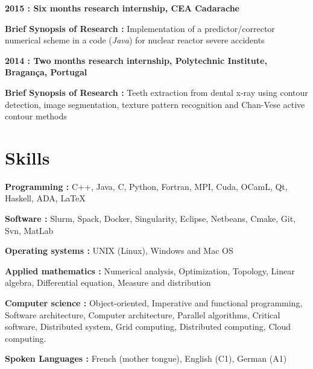 \documentclass{article}
\renewenvironment{itemize}{
  \begin{list}{}{
      \setlength{\leftmargin}{1.5em}
      \setlength{\itemsep}{0.25em}
      \setlength{\parskip}{0pt}
      \setlength{\parsep}{0.25em}
    }
}{
  \end{list}
}
\begin{document}
\begin{itemize}
\begin{itemize}
			\end{itemize}
	\item \textbf{2015 : Six months research internship, CEA Cadarache}
		\begin{itemize}
			\item \textbf{Brief Synopsis of Research :} Implementation of a predictor/corrector numerical scheme in a code (\textit{Java}) for nuclear reactor severe accidents
		\end{itemize}
	\item \textbf{2014 : Two months research internship, Polytechnic Institute, Bragança, Portugal}
		\begin{itemize}
			\item \textbf{Brief Synopsis of Research :} Teeth extraction from dental x-ray using contour detection, image segmentation, texture pattern recognition and Chan-Vese active contour methods
		\end{itemize}
\end{itemize}  

\section*{Skills}
\begin{itemize}
	\item \textbf{Programming :} C++, Java, C, Python, Fortran, MPI, Cuda, OCamL, Qt, Haskell, ADA, \LaTeX
	\item \textbf{Software :} Slurm, Spack, Docker, Singularity, Eclipse, Netbeans, Cmake, Git, Svn, MatLab
	\item \textbf{Operating systems :} UNIX (Linux), Windows and Mac OS
	\item \textbf{Applied mathematics :} Numerical analysis, Optimization, Topology, Linear algebra, Differential equation, Measure and distribution
	\item \textbf{Computer science :} Object-oriented, Imperative and functional programming, Software architecture, Computer architecture, Parallel algorithms, Critical software, Distributed system, Grid computing, Distributed computing, Cloud computing.
	\item \textbf{Spoken Languages :} French (mother tongue), English (C1), German (A1)
\end{itemize}  
\end{document}
